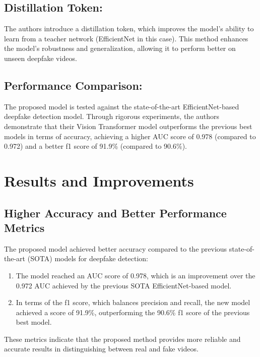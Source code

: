 \documentclass{report}
\begin{document}
	
	
	\subsection{Distillation Token:}
	The authors introduce a distillation token, which improves the model's ability to learn from a teacher network (EfficientNet in this case). This method enhances the model's robustness and generalization, allowing it to perform better on unseen deepfake videos.
	
	
	
	\subsection{Performance Comparison:}
	The proposed model is tested against the state-of-the-art EfficientNet-based deepfake detection model. Through rigorous experiments, the authors demonstrate that their Vision Transformer model outperforms the previous best models in terms of accuracy, achieving a higher AUC score of 0.978 (compared to 0.972) and a better f1 score of 91.9\% (compared to 90.6\%).
	
	
	
	
	\section{Results and Improvements}
	
	\subsection{Higher Accuracy and Better Performance Metrics}
	The proposed model achieved better accuracy compared to the previous state-of-the-art (SOTA) models for deepfake detection:
	\begin{enumerate}
		\item 
		The model reached an AUC score of 0.978, which is an improvement over the 0.972 AUC achieved by the previous SOTA EfficientNet-based model.
		
		\item 
		In terms of the f1 score, which balances precision and recall, the new model achieved a score of 91.9\%, outperforming the 90.6\% f1 score of the previous best model.
	\end{enumerate}
	These metrics indicate that the proposed method provides more reliable and accurate results in distinguishing between real and fake videos.
	
	
	
\end{document}
